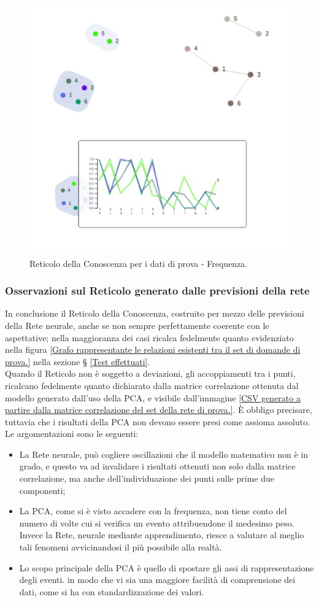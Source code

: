 \begin{figure}[H]
\centering
	\includegraphics[width=0.50\linewidth]{./image/collage_reticolo-general-FREQ.png}
	\caption{Reticolo della Conoscenza per i dati di prova - Frequenza.}
	\label{Reticolo della Conoscenza per i dati di prova - Frequenza.}
\end{figure}
\noindent


\subsubsection{Osservazioni sul Reticolo generato dalle previsioni della rete}
\label{Osservazioni generato dalla previsioni della rete}
In conclusione il Reticolo della Conoscenza, costruito per mezzo delle previsioni della Rete neurale, anche se non sempre perfettamente coerente con le aspettative; nella maggioranza dei casi ricalca fedelmente quanto evidenziato nella figura \ref{Grafo rappresentante le relazioni esistenti tra il set di domande di prova.} nella sezione § \ref{Test effettuati}. \\
Quando il Reticolo non \`e soggetto a deviazioni, gli accoppiamenti tra i punti, ricalcano fedelmente quanto dichiarato dalla matrice correlazione ottenuta dal modello generato dall'uso della PCA, e visibile dall'immagine \ref{CSV generato a partire dalla matrice correlazione del set della rete di prova.}.
\`E obbligo precisare, tuttavia che i risultati della PCA non devono essere presi come assioma assoluto. Le argomentazioni sono le seguenti:
\begin{itemize} 
\item La Rete neurale, pu\`o cogliere oscillazioni che il modello matematico non \`e in grado, e questo va ad invalidare i risultati ottenuti non solo dalla matrice correlazione, ma anche dell'individuazione dei punti sulle prime due componenti;
\item La PCA, come si \`e visto accadere con la frequenza, non tiene conto del numero di volte cui si verifica un evento attribuendone il medesimo peso. Invece la Rete, neurale mediante apprendimento, riesce a valutare al meglio tali fenomeni avvicinandosi il pi\`u possibile alla realt\`a.
\item Lo scopo principale della PCA \`e quello di spostare gli assi di rappresentazione degli eventi. in modo che vi sia una maggiore facilit\`a di comprensione dei dati, come si ha con standardizzazione dei valori.
\end{itemize}

